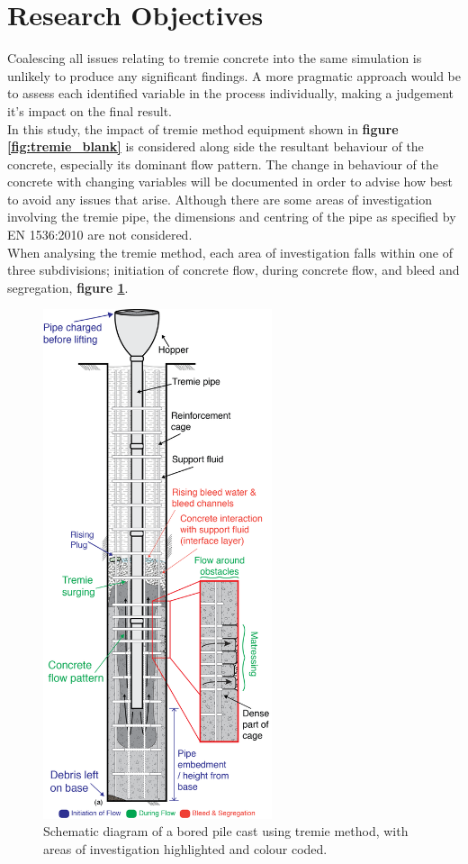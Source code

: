 \section{Research Objectives}
Coalescing all issues relating to tremie concrete into the same simulation is unlikely to produce any significant findings. A more pragmatic approach would be to assess each identified variable in the process individually, making a judgement it's impact on the final result.\\
\newline
\noindent
In this study, the impact of tremie method equipment shown in {\bfseries figure \ref{fig:tremie_blank}} is considered along side the resultant behaviour of the concrete, especially its dominant flow pattern. The change in behaviour of the concrete with changing variables will be documented in order to advise how best to avoid any issues that arise. Although there are some areas of investigation involving the tremie pipe, the dimensions and centring of the pipe as specified by EN 1536:2010 are not considered. \\
\newline
\noindent
When analysing the tremie method, each area of investigation falls within one of three subdivisions; initiation of concrete flow, during concrete flow, and bleed and segregation, {\bfseries figure \ref{fig:tremie_colour}}.
\begin{figure}[H]
\centering
\includegraphics[width=0.6\textwidth]{combined_firstyear.png}
\caption{\label{fig:tremie_colour} Schematic diagram of a bored pile cast using tremie method, with areas of investigation highlighted and colour coded.}
\end{figure}









